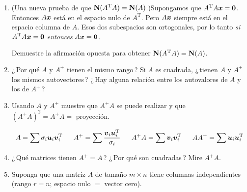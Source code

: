\documentclass[12pt,a4paper]{article}
\newcommand{\summ}{\displaystyle\sum}
\newcommand{\bi}[1]{\hbox{\boldmath$#1$}}
\newcommand\1{\mbox{\,\vrule height-0.8pt depth1.0pt width2pc\,}}
\newcommand\2{\mbox{\,\vrule height-0.8pt depth1.0pt width1pc\,}}
\DeclareRobustCommand\transp{^{\mathrm{T}}}
\newcommand{\bv}{\hbox{\boldmath$v$}}
\begin{document}
\begin{enumerate}

\item (Una nueva prueba de que $\hbox{\textbf{N}}(A\transp A)=\hbox{\textbf{N}}(A)$.)\index[smbl]{$\hbox{\textbf{N}}(A\transp A)=\,\hbox{\textbf{N}}(A)$}\quad Supongamos que $A\transp A\bi{x}=\bi{0}$. Entonces $A\bi{x}$ está en el espacio nulo de $A\transp$. Pero $A\bi{x}$ siempre está en el espacio columna de $A$. Esos dos subespacios son ortogonales, por lo tanto \emph{si $A\transp A\bi{x}=\bi{0}$ entonces} $A\bi{x}=\bi{0}$.

Demuestre la afirmación opuesta para obtener  $\hbox{\textbf{N}}(A\transp A)=\hbox{\textbf{N}}(A)$.
\item ¿\,Por qué $A$ y $A^+$ tienen el mismo rango\,? Si $A$ es cuadrada, ¿\,tienen $A$ y $A^+$ los mismos autovectores\,? ¿\,Hay alguna relación entre los autovalores de $A$ y los de $A^+$\,?
\item   Usando $A$ y $A^+$ muestre que $A^+A$ se puede realizar y que $(A^+A)^2=A^+A=$ proyección.\linebreak

\vspace{-27pt}
  \begin{displaymath}
    A = \summ \sigma_i \bi u_i \bv_i\transp \quad \quad
    A^{+} = \summ \dfrac{\bv_i \bi u_i\transp}{\sigma_i}
    \quad \quad A^{+}A = \summ \bv_i \bv_i\transp \quad
    \quad AA^{+} = \summ \bi u_i \bi u_i\transp
  \end{displaymath}
\vspace{-15pt}

\item ¿\,Qué matrices tienen $A^+=A$\,? ¿\,Por qué son cuadradas\,? Mire $A^+A$.
\item Suponga que una matriz $A$ de tamaño $m \times n$  tiene columnas independientes (rango $r=n$; espacio nulo $=$ vector cero).


\end{enumerate}
\end{document}
